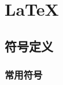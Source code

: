 \documentclass[shortmath]{AirNote}
\begin{document}
\def\thepage{π}
\maketitle
\frontmatter
{}
\tableofcontents
\mainmatter
\pagestyle{fancy}
\chapter{\texorpdfstring{\LaTeX}{LaTeX}}
\section{符号定义}
\subsection{常用符号}
\end{document}
